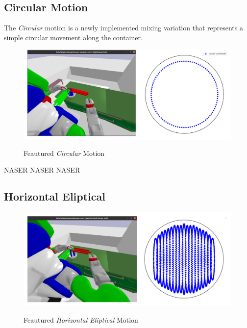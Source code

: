 \subsection{Circular Motion}
The \textit{Circular} motion is a newly implemented mixing variation that represents a simple circular movement along the container.
\begin{figure}[H]
    \includegraphics[scale=0.3]{Graphics/circular_showcase.jpg}
    \label{fig:circularshowcase}
    \caption{Feautured \textit{Circular} Motion}
\end{figure}
NASER NASER NASER
\subsection{Horizontal Eliptical}
\begin{figure}[H]
    \includegraphics[scale=0.3]{Graphics/horizontal_eliptical_chart.jpg}
    \label{fig:circularshowcase}
    \caption{Feautured \textit{Horizontal Eliptical} Motion}
\end{figure}


